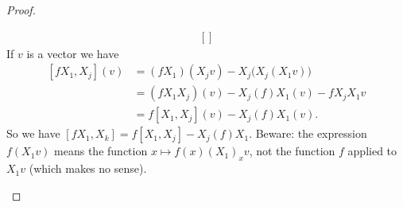 \begin{proof}
\begin{subproof}
\begin{equation}
\begin{aligned}[]
			\end{aligned}
		\end{equation}
		If \( v\) is a vector we have
		\begin{subequations}
			\begin{align}
				[fX_1,X_j](v) & =(fX_1)(X_jv)-X_j\big( X_j(X_1v) \big) \\
				              & =(fX_1X_j)(v)-X_j(f)X_1(v)-fX_jX_1v    \\
				              & =f[X_1,X_j](v)-X_j(f)X_1(v).
			\end{align}
		\end{subequations}
		So we have \( [fX_1,X_k]=f[X_1,X_j]-X_j(f)X_1\). Beware: the expression \( f(X_1v)\) means the function \( x\mapsto f(x)(X_1)_xv\), not the function \( f\) applied to \( X_1v\) (which makes no sense).


\end{subproof}
\end{proof}
